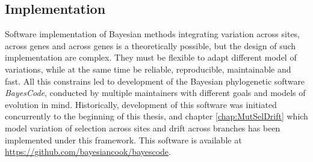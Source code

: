 \subsection{Implementation}
\label{subsec:implementation}

Software implementation of Bayesian methods integrating variation across sites, across genes and across genes is a theoretically possible, but the design of such implementation are complex.
They must be flexible to adapt different model of variations, while at the same time be reliable, reproducible, maintainable and fast.
All this constrains led to development of the Bayesian phylogenetic software \textit{BayesCode}, conducted by multiple maintainers with different goals and models of evolution in mind.
Historically, development of this software was initiated concurrently to the beginning of this thesis, and chapter \ref{chap:MutSelDrift} which model variation of selection across sites and drift across branches has been implemented under this framework.
This software is available at \url{https://github.com/bayesiancook/bayescode}.


